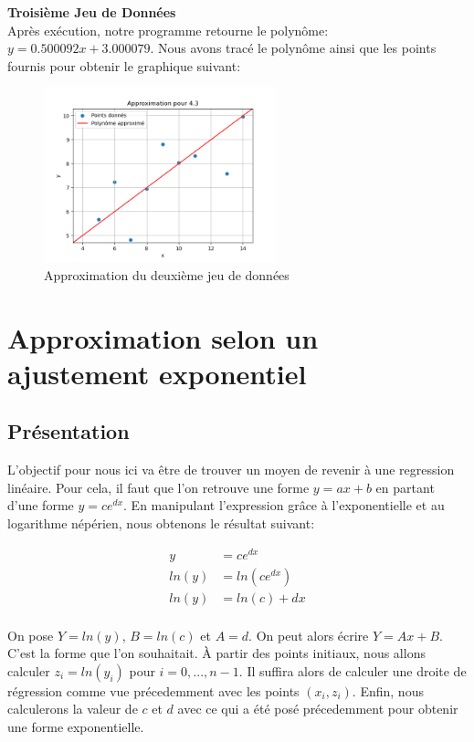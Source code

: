 \newpage
\textbf{Troisième Jeu de Données}\\
Après exécution, notre programme retourne le polynôme: $y=0.500092x+3.000079$. Nous avons tracé le polynôme ainsi que les points fournis pour obtenir le graphique suivant:\\
\begin{figure}[h]
    \centering
    \includegraphics[width=0.6\textwidth]{sources/Corentin/approximationC/results/graphs/43.png}
    \caption{Approximation du deuxième jeu de données}
\end{figure}
\newpage
\section{Approximation selon un ajustement exponentiel}
\subsection{Présentation}
L'objectif pour nous ici va être de trouver un moyen de revenir à une regression linéaire. Pour cela, il faut que l'on retrouve une forme $y=ax+b$ en partant d'une forme $y=ce^{dx}$. En manipulant l'expression grâce à l'exponentielle et au logarithme népérien, nous obtenons le résultat suivant: \\
\begin{center}
    \begin{align*}
        y&=ce^{dx}\\
        ln(y)&=ln(ce^{dx})\\
        ln(y)&=ln (c)+ dx \\
    \end{align*}
\end{center}
On pose $Y=ln(y)$, $B=ln(c)$ et $A=d$. On peut alors écrire $Y=Ax+B$. C'est la forme que l'on souhaitait.
À partir des points initiaux, nous allons calculer $z_i=ln(y_i)$ pour $i=0,..., n-1$. Il suffira alors de calculer une droite de régression comme vue précedemment avec les points $(x_i, z_i)$. Enfin, nous calculerons la valeur de $c$ et $d$ avec ce qui a été posé précedemment pour obtenir une forme exponentielle. 
